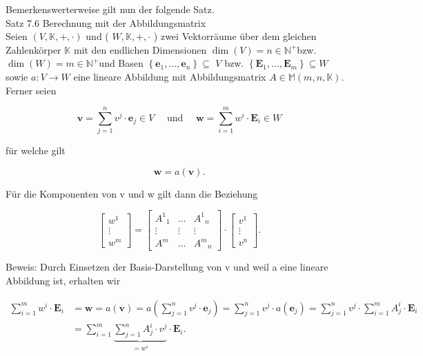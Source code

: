 \documentclass[10pt]{article}
\begin{document}
Bemerkenswerterweise gilt nun der folgende Satz.\\
Satz 7.6 Berechnung mit der Abbildungsmatrix\\
Seien $(V, \mathbb{K},+, \cdot)$ und ( $W, \mathbb{K},+, \cdot$ ) zwei Vektorräume über dem gleichen Zahlenkörper $\mathbb{K}$ mit den endlichen Dimensionen $\operatorname{dim}(V)=n \in \mathbb{N}^{+}$bzw. $\operatorname{dim}(W)=m \in \mathbb{N}^{+}$und Basen $\left\{\mathbf{e}_{1}, \ldots, \mathbf{e}_{n}\right\} \subseteq$ $V$ bzw. $\left\{\mathbf{E}_{1}, \ldots, \mathbf{E}_{m}\right\} \subseteq W$ sowie $a: V \rightarrow W$ eine lineare Abbildung mit Abbildungsmatrix $A \in \mathbb{M}(m, n, \mathbb{K})$. Ferner seien


\begin{equation*}
\mathbf{v}=\sum_{j=1}^{n} v^{j} \cdot \mathbf{e}_{j} \in V \quad \text { und } \quad \mathbf{w}=\sum_{i=1}^{m} w^{i} \cdot \mathbf{E}_{i} \in W \tag{7.38}
\end{equation*}


für welche gilt


\begin{equation*}
\mathbf{w}=a(\mathbf{v}) . \tag{7.39}
\end{equation*}


Für die Komponenten von v und w gilt dann die Beziehung

\[
\left[\begin{array}{c}
w^{1}  \tag{7.40}\\
\vdots \\
w^{m}
\end{array}\right]=\left[\begin{array}{ccc}
A^{1}{ }_{1} & \ldots & A^{1}{ }_{n} \\
\vdots & \vdots & \vdots \\
A^{m} & \ldots & A^{m}{ }_{n}
\end{array}\right] \cdot\left[\begin{array}{c}
v^{1} \\
\vdots \\
v^{n}
\end{array}\right] .
\]

Beweis: Durch Einsetzen der Basis-Darstellung von v und weil a eine lineare Abbildung ist, erhalten wir


\begin{align*}
\sum_{i=1}^{m} w^{i} \cdot \mathbf{E}_{i} & =\mathbf{w}=a(\mathbf{v})=a\left(\sum_{j=1}^{n} v^{j} \cdot \mathbf{e}_{j}\right)=\sum_{j=1}^{n} v^{j} \cdot a\left(\mathbf{e}_{j}\right)=\sum_{j=1}^{n} v^{j} \cdot \sum_{i=1}^{m} A_{j}^{i} \cdot \mathbf{E}_{i} \\
& =\sum_{i=1}^{m} \underbrace{\sum_{j=1}^{n} A_{j}^{i} \cdot v^{j}}_{=w^{i}} \cdot \mathbf{E}_{i} . \tag{7.41}
\end{align*}
\end{document}
